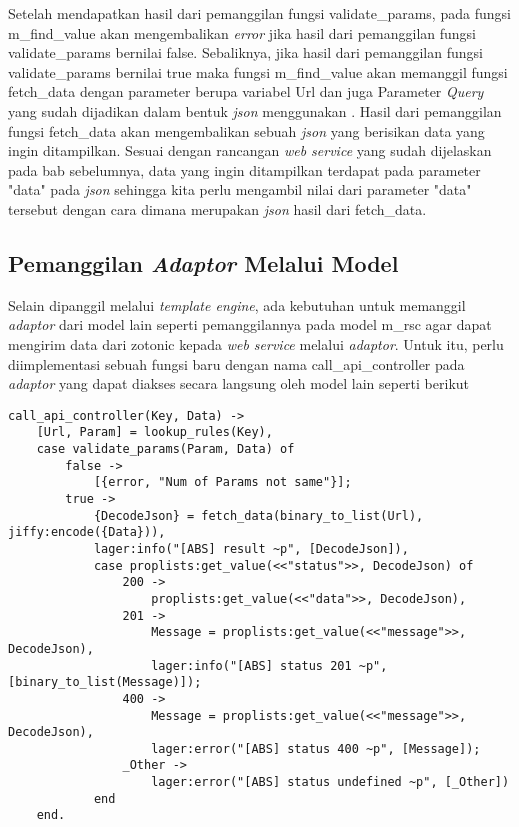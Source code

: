 Setelah mendapatkan hasil dari pemanggilan fungsi validate\_params, pada fungsi m\_find\_value akan mengembalikan \textit{error} jika hasil dari pemanggilan fungsi validate\_params bernilai false. Sebaliknya, jika hasil dari pemanggilan fungsi validate\_params bernilai true maka fungsi m\_find\_value akan memanggil fungsi fetch\_data dengan parameter berupa variabel Url dan juga Parameter \textit{Query} yang sudah dijadikan dalam bentuk \textit{json} menggunakan . Hasil dari pemanggilan fungsi fetch\_data akan mengembalikan sebuah \textit{json} yang berisikan data yang ingin ditampilkan. Sesuai dengan rancangan \textit{web service} yang sudah dijelaskan pada bab sebelumnya, data yang ingin ditampilkan terdapat pada parameter "data" pada \textit{json} sehingga kita perlu mengambil nilai dari parameter "data" tersebut dengan cara  dimana  merupakan \textit{json} hasil dari fetch\_data.

\subsection{Pemanggilan \textit{Adaptor} Melalui Model}

Selain dipanggil melalui \textit{template engine}, ada kebutuhan untuk memanggil \textit{adaptor} dari model lain seperti pemanggilannya pada model m\_rsc agar dapat mengirim data dari zotonic kepada \textit{web service} melalui \textit{adaptor}. Untuk itu, perlu diimplementasi sebuah fungsi baru dengan nama call\_api\_controller pada \textit{adaptor} yang dapat diakses secara langsung oleh model lain seperti berikut

\begin{minipage}{\linewidth}
\begin{lstlisting}[caption={Implementasi fungsi untuk pemanggilan \textit{adaptor} dari model},label={lst:adaptormodel}]
call_api_controller(Key, Data) ->
	[Url, Param] = lookup_rules(Key),
	case validate_params(Param, Data) of
		false ->
			[{error, "Num of Params not same"}];
		true ->
			{DecodeJson} = fetch_data(binary_to_list(Url), jiffy:encode({Data})),
			lager:info("[ABS] result ~p", [DecodeJson]),
			case proplists:get_value(<<"status">>, DecodeJson) of
				200 ->
					proplists:get_value(<<"data">>, DecodeJson),
				201 ->
					Message = proplists:get_value(<<"message">>, DecodeJson),
					lager:info("[ABS] status 201 ~p", [binary_to_list(Message)]);
				400 ->
					Message = proplists:get_value(<<"message">>, DecodeJson),
					lager:error("[ABS] status 400 ~p", [Message]);
				_Other -> 
					lager:error("[ABS] status undefined ~p", [_Other])
			end  
	end.
\end{lstlisting}
\end{minipage}

